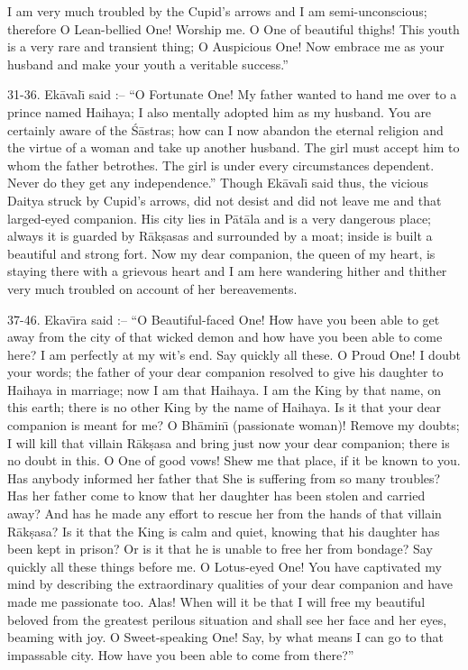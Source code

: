 I am very much troubled by the Cupid's arrows and I am semi-unconscious; therefore O Lean-bellied One! Worship me. O One of beautiful thighs! This youth is a very rare and transient thing; O Auspicious One! Now embrace me as your husband and make your youth a veritable success.''

31-36. Ek\=aval\={\i} said :-- ``O Fortunate One! My father wanted to hand me over to a prince named Haihaya; I also mentally adopted him as my husband. You are certainly aware of the \'S\=astras; how can I now abandon the eternal religion and the virtue of a woman and take up another husband. The girl must accept him to whom the father betrothes. The girl is under every circumstances dependent. Never do they get any independence.'' Though Ek\=aval\={\i} said thus, the vicious Daitya struck by Cupid's arrows, did not desist and did not leave me and that larged-eyed companion. His city lies in P\=at\=ala and is a very dangerous place; always it is guarded by R\=ak\d{s}asas and surrounded by a moat; inside is built a beautiful and strong fort. Now my dear companion, the queen of my heart, is staying there with a grievous heart and I am here wandering hither and thither very much troubled on account of her bereavements.

37-46. Ekav\={\i}ra said :-- ``O Beautiful-faced One! How have you been able to get away from the city of that wicked demon and how have you been able to come here? I am perfectly at my wit's end. Say quickly all these. O Proud One! I doubt your words; the father of your dear companion resolved to give his daughter to Haihaya in marriage; now I am that Haihaya. I am the King by that name, on this earth; there is no other King by the name of Haihaya. Is it that your dear companion is meant for me? O Bh\=amin\={\i} (passionate woman)! Remove my doubts; I will kill that villain R\=ak\d{s}asa and bring just now your dear companion; there is no doubt in this. O One of good vows! Shew me that place, if it be known to you. Has anybody informed her father that She is suffering from so many troubles? Has her father come to know that her daughter has been stolen and carried away? And has he made any effort to rescue her from the hands of that villain R\=ak\d{s}asa? Is it that the King is calm and quiet, knowing that his daughter has been kept in prison? Or is it that he is unable to free her from bondage? Say quickly all these things before me. O Lotus-eyed One! You have captivated my mind by describing the extraordinary qualities of your dear companion and have made me passionate too. Alas! When will it be that I will free my beautiful beloved from the greatest perilous situation and shall see her face and her eyes, beaming with joy. O Sweet-speaking One! Say, by what means I can go to that impassable city. How have you been able to come from there?''

